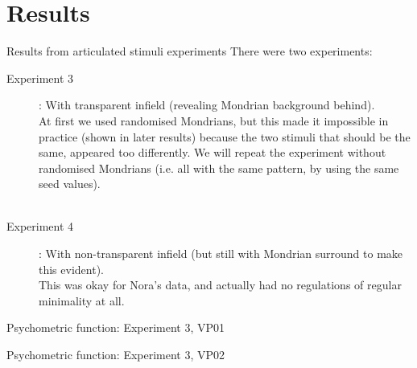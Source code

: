 \documentclass{beamer}
\begin{document}
\section{Results}
\begin{frame}[t]{Results from articulated stimuli experiments}
There were two experiments:\\

\begin{description}
\item[Experiment 3]:  With transparent infield (revealing Mondrian background behind).\\
At first we used randomised Mondrians, but this made it impossible in practice (shown in later results) because the two stimuli that should be the same, appeared too differently. We will repeat the experiment without randomised Mondrians (i.e. all with the same pattern, by using the same seed values).\\
~\\

\item[Experiment 4]:  With non-transparent infield (but still with Mondrian surround to make this evident).\\
 This was okay for Nora's data, and actually had no regulations of regular minimality at all.

\end{description}
\end{frame}


\begin{frame}[t]{Psychometric function: Experiment 3, VP01}
\end{frame}

\begin{frame}[t]{Psychometric function: Experiment 3, VP02}
\end{frame}
\end{document}
